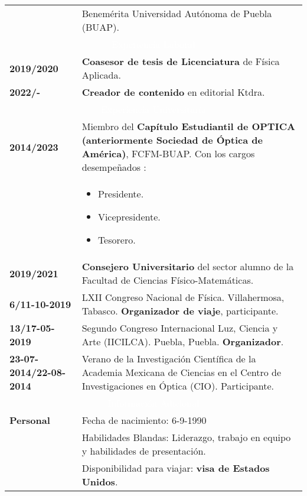 \documentclass[twoside,letter,openright,10pt]{report}
\begin{document}
\begin{table}[hbt!]
\begin{tabular}{p{40mm}p{140mm}}
\\
& Benemérita Universidad Autónoma de Puebla (BUAP). 
\\
\multicolumn{2}{c}{\cellcolor{black} \textcolor{white}{Experiencia Laboral}}
\\
\textbf{2019/2020} & \textbf{Coasesor de tesis de Licenciatura}  de Física Aplicada.
\\
\textbf{2022/-} & \textbf{Creador de contenido} en editorial Ktdra.
\\
\multicolumn{2}{c}{\cellcolor{black} \textcolor{white}{Experiencia Universitaria}}
\\
\textbf{2014/2023} & Miembro del \textbf{Capítulo Estudiantil de OPTICA (anteriormente Sociedad de Óptica de América)}, FCFM-BUAP. Con los cargos desempeñados :\\
& \vspace{-2mm} \begin{itemize}[noitemsep,nolistsep]
\item Presidente.
\item Vicepresidente.
\item Tesorero.
\vspace{-4mm}
\end{itemize}
\\
\textbf{2019/2021} & \textbf{Consejero Universitario} del sector alumno de la Facultad de Ciencias Físico-Matemáticas.
\\
\textbf{6/11-10-2019} &LXII Congreso Nacional de Física. Villahermosa, Tabasco. \textbf{Organizador de viaje}, participante.
\\
\textbf{13/17-05-2019} &Segundo Congreso Internacional Luz, Ciencia y Arte (IICILCA). Puebla, Puebla. \textbf{Organizador}.
\\
\textbf{23-07-2014/22-08-2014} & Verano de la Investigación Científica de la Academia Mexicana de Ciencias en el Centro de Investigaciones en Óptica (CIO). Participante.
\\
\multicolumn{2}{c}{\cellcolor{black} \textcolor{white}{Información Adicional}}
\\
\textbf{Personal} &  Fecha de nacimiento: 6-9-1990
\\
& Habilidades Blandas: Liderazgo, trabajo en equipo y habilidades de presentación.
\\
& Disponibilidad para viajar: \textbf{visa de Estados Unidos}.

\end{tabular}
\end{table}
\end{document}
